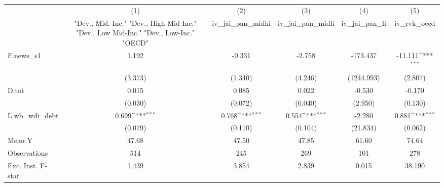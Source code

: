 {
\def\sym#1{\ifmmode^{#1}\else\(^{#1}\)\fi}
\begin{tabular}{l*{5}{c}}
\toprule
            &\multicolumn{1}{c}{(1)}&\multicolumn{1}{c}{(2)}&\multicolumn{1}{c}{(3)}&\multicolumn{1}{c}{(4)}&\multicolumn{1}{c}{(5)}\\
            &\multicolumn{1}{c}{ "Dev., Mid.-Inc." "Dev., High Mid-Inc." "Dev., Low Mid-Inc." "Dev., Low-Inc." "OECD" }&\multicolumn{1}{c}{iv\_jai\_pan\_midhi}&\multicolumn{1}{c}{iv\_jai\_pan\_midli}&\multicolumn{1}{c}{iv\_jai\_pan\_li}&\multicolumn{1}{c}{iv\_rvk\_oecd}\\
\midrule
F.news\_s1   &       1.192         &      -0.331         &      -2.758         &    -173.437         &     -11.111\sym{***}\\
            &     (3.373)         &     (1.340)         &     (4.246)         &  (1244.993)         &     (2.807)         \\
\addlinespace
D.tot       &       0.015         &       0.085         &       0.022         &      -0.530         &      -0.170         \\
            &     (0.030)         &     (0.072)         &     (0.040)         &     (2.950)         &     (0.130)         \\
\addlinespace
L.wb\_wdi\_debt&       0.699\sym{***}&       0.768\sym{***}&       0.554\sym{***}&      -2.280         &       0.881\sym{***}\\
            &     (0.079)         &     (0.110)         &     (0.104)         &    (21.834)         &     (0.062)         \\
\midrule
Mean Y      &       47.68         &       47.50         &       47.85         &       61.60         &       74.64         \\
Observations&         514         &         245         &         269         &         101         &         278         \\
Exc. Inst. F-stat&       1.439         &       3.854         &       2.839         &       0.015         &      38.190         \\
\bottomrule
\end{tabular}
}
